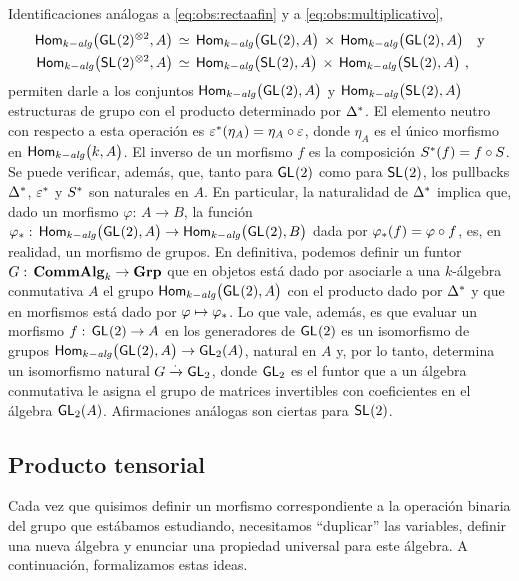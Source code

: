 Identificaciones an\'{a}logas a \eqref{eq:obs:rectaafin} y a
\eqref{eq:obs:multiplicativo},
\begin{align*}
	\Homalg\big(\GL(2)^{\otimes 2},A\big) & \,\simeq\,
		\Homalg\big(\GL(2),A\big)\,\times\,
		\Homalg\big(\GL(2),A\big) \quad\text{y} \\
	\Homalg\big(\SL(2)^{\otimes 2},A\big) & \,\simeq\,
		\Homalg\big(\SL(2),A\big)\,\times\,
		\Homalg\big(\SL(2),A\big)
	\text{ ,}
\end{align*}
%
permiten darle a los conjuntos $\Homalg\big(\GL(2),A\big)$ y
$\Homalg\big(\SL(2),A\big)$ estructuras de grupo con el producto determinado
por $\pull\Delta$. El elemento neutro con respecto a esta operaci\'{o}n
es $\pull\varepsilon(\eta_A)=\eta_A\circ\varepsilon$, donde $\eta_A$ es el
\'{u}nico morfismo en $\Homalg\big(k,A\big)$. El inverso de un morfismo $f$ es
la composici\'{o}n $\pull S(f)=f\circ S$. Se puede verificar, adem\'{a}s, que,
tanto para $\GL(2)$ como para $\SL(2)$, los pullbacks $\pull\Delta$,
$\pull\varepsilon$ y $\pull S$ son naturales en $A$.
%
En particular, la naturalidad de $\pull\Delta$ implica que, dado un morfismo
$\varphi:\,A\rightarrow B$, la funci\'{o}n
$\push\varphi:\,\Homalg\big(\GL(2),A\big)\rightarrow\Homalg\big(\GL(2),B\big)$
dada por $\push\varphi(f)=\varphi\circ f$, es, en realidad, un morfismo de
grupos. En definitiva, podemos definir un funtor
$G:\,\CommAlg[k]\rightarrow\Grp$ que en objetos est\'{a} dado por asociarle a
una $k$-\'{a}lgebra conmutativa $A$ el grupo $\Homalg\big(\GL(2),A\big)$ con el
producto dado por $\pull\Delta$ y que en morfismos est\'{a} dado por
$\varphi\mapsto\push\varphi$. Lo que vale, adem\'{a}s, es que evaluar un
morfismo $f:\,\GL(2)\rightarrow A$ en los generadores de $\GL(2)$ es un
isomorfismo de grupos $\Homalg\big(\GL(2),A\big)\rightarrow\GL[2](A)$, natural
en $A$ y, por lo tanto, determina un isomorfismo natural
$G\xrightarrow\cdot\GL[2]$, donde $\GL[2]$ es el funtor que a un \'{a}lgebra
conmutativa le asigna el grupo de matrices invertibles con coeficientes en el
\'{a}lgebra $\GL[2](A)$. Afirmaciones an\'{a}logas son ciertas para $\SL(2)$.

\subsection{Producto tensorial}\label{subsec:kalgebras:productotensorial}

Cada vez que quisimos definir un morfismo correspondiente a la operaci\'{o}n
binaria del grupo que est\'{a}bamos estudiando, necesitamos ``duplicar'' las
variables, definir una nueva \'{a}lgebra y enunciar una propiedad universal
para este \'{a}lgebra. A continuaci\'{o}n, formalizamos estas ideas.

